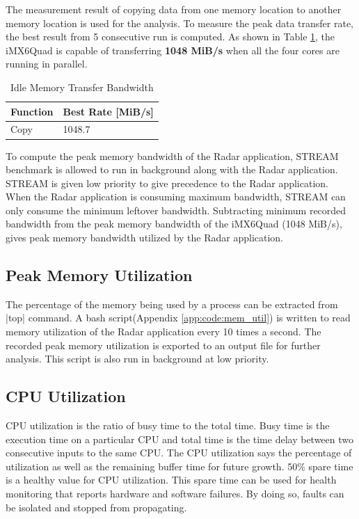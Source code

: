 
The measurement result of copying data from one memory location to another memory location is used for the  analysis. To measure the peak data transfer rate, the best result from 5 consecutive run is computed. As shown in Table \ref{tbl:mm:bw_no_load}, the iMX6Quad is capable of transferring \textbf{1048 MiB/s} when all the four cores are running in parallel.\\

\begin{table}[h!]
	\centering
	\begin{tabular}{|l|l|} 
	 \hline
	 \textbf{Function} & \textbf{Best Rate [MiB/s]}  \\
	 \hline
	 Copy & 1048.7 \\ \hline
	\end{tabular}
	\caption{Idle Memory Transfer Bandwidth}
	\label{tbl:mm:bw_no_load}
\end{table}

To compute the peak memory bandwidth of the Radar application, STREAM benchmark is allowed to run in background along with the Radar application. STREAM is given low priority to give precedence to the Radar application. When the Radar application is consuming maximum bandwidth, STREAM can only consume the minimum leftover bandwidth. Subtracting minimum recorded bandwidth from the peak memory bandwidth of the iMX6Quad (1048 MiB/s), gives peak memory bandwidth utilized by the Radar application.

\subsection{Peak Memory Utilization}
\label{ss:mm:mem_util}
The percentage of the memory being used by a process can be extracted from \bverb|top| command. A bash script(Appendix \ref{app:code:mem_util}) is written to read memory utilization of the Radar application every 10 times a second. The recorded peak memory utilization is exported to an output file for further analysis. This script is also run in background at low priority.

\subsection{CPU Utilization}
\label{ss:mm:cpu_load}
CPU utilization is the ratio of busy time to the total time. Busy time is the execution time on a particular CPU and total time is the time delay between two consecutive inputs to the same CPU. The CPU utilization says the percentage of utilization as well as the remaining buffer time for future growth. 50\% spare time is a healthy value for CPU utilization. This spare time can be used for health monitoring that reports hardware and software failures. By doing so, faults can be isolated and stopped from propagating.

